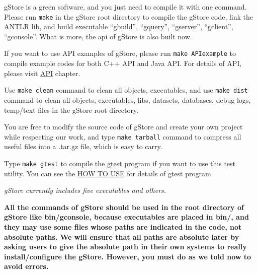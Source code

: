 \documentclass[titlepage, a4paper, 12pt]{article}
\begin{document}
\clearpage


gStore is a green software, and you just need to compile it with one command. Please run \texttt{make} in the gStore root directory to compile the gStore code, link the ANTLR lib, and build executable ``gbuild'', ``gquery'', ``gserver'', ``gclient'', ``gconsole''. What is more, the api of gStore is also built now.

If you want to use API examples of gStore, please run \texttt{make\ APIexample} to compile example codes for both C++ API and Java API. For details of API, please visit \hyperref[chapter05]{API} chapter.

Use \texttt{make\ clean} command to clean all objects, executables, and use \texttt{make\ dist} command to clean all objects, executables, libs, datasets, databases, debug logs, temp/text files in the gStore root directory.

You are free to modify the source code of gStore and create your own project while respecting our work, and type \texttt{make\ tarball} command to compress all useful files into a .tar.gz file, which is easy to carry.

Type \texttt{make\ gtest} to compile the gtest program if you want to use this test utility. You can see the \hyperref[chapter04]{HOW TO USE} for details of gtest program.

\clearpage


\textit{gStore currently includes five executables and others.}

\textbf{All the commands of gStore should be used in the root directory of gStore like bin/gconsole, because executables are placed in bin/, and they may use some files whose paths are indicated in the code, not absolute paths. We will ensure that all paths are absolute later by asking users to give the absolute path in their own systems to really install/configure the gStore. However, you must do as we told now to avoid errors.}

\end{document}
